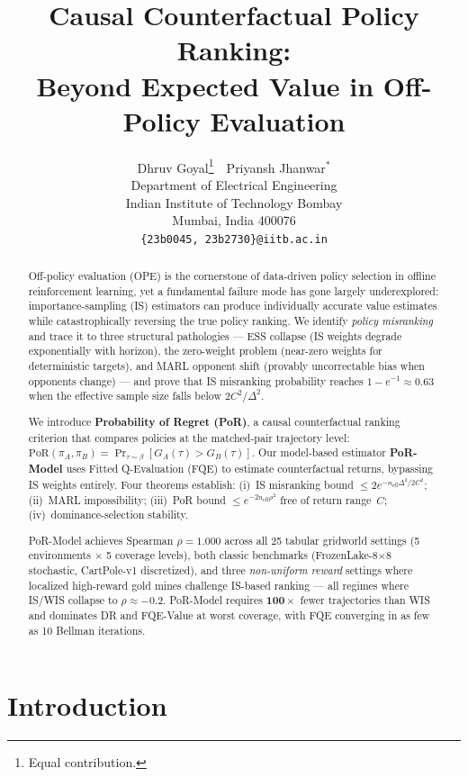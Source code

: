 \documentclass[10pt]{article}
\title{Causal Counterfactual Policy Ranking:\\
       Beyond Expected Value in Off-Policy Evaluation}
\author{%
  Dhruv Goyal\thanks{Equal contribution.}\ \
  Priyansh Jhanwar$^*$\\[2pt]
  Department of Electrical Engineering\\
  Indian Institute of Technology Bombay\\
  Mumbai, India 400076\\
  \texttt{\{23b0045, 23b2730\}@iitb.ac.in}
}
\theoremstyle{plain}
\theoremstyle{definition}
\theoremstyle{remark}
\newcommand{\PoR}{\mathrm{PoR}}
\newcommand{\neff}{n_{\mathrm{eff}}}
\newcommand{\piA}{\pi_A}
\newcommand{\piB}{\pi_B}
\newcommand{\GA}{G_A}
\newcommand{\GB}{G_B}
\begin{document}
\maketitle

\begin{abstract}
Off-policy evaluation (OPE) is the cornerstone of data-driven policy selection
in offline reinforcement learning, yet a fundamental failure mode has gone
largely underexplored: importance-sampling (IS) estimators can produce
individually accurate value estimates while catastrophically reversing the true
policy ranking.  We identify \emph{policy misranking} and trace it to three
structural pathologies --- ESS collapse (IS weights degrade exponentially with
horizon), the zero-weight problem (near-zero weights for deterministic targets),
and MARL opponent shift (provably uncorrectable bias when opponents change) ---
and prove that IS misranking probability reaches $1{-}e^{-1}\!\approx\!0.63$
when the effective sample size falls below $2C^2/\Delta^2$.

We introduce \textbf{Probability of Regret (PoR)}, a causal counterfactual
ranking criterion that compares policies at the matched-pair trajectory level:
$\PoR(\piA,\piB)=\Pr_{\tau\sim\beta}[\GA(\tau)>\GB(\tau)]$.  Our model-based
estimator \textbf{PoR-Model} uses Fitted Q-Evaluation (FQE) to estimate
counterfactual returns, bypassing IS weights entirely.  Four theorems establish:
(i)~IS misranking bound $\leq 2e^{-\neff\Delta^2/2C^2}$; (ii)~MARL
impossibility; (iii)~PoR bound $\leq e^{-2\neff\rho^2}$ free of return
range~$C$; (iv)~dominance-selection stability.

PoR-Model achieves Spearman $\rho{=}1.000$ across all 25 tabular gridworld
settings (5 environments $\times$ 5 coverage levels), both classic benchmarks
(FrozenLake-8$\times$8 stochastic, CartPole-v1 discretized), and three
\emph{non-uniform reward} settings where localized high-reward gold mines
challenge IS-based ranking --- all regimes where IS/WIS collapse to
$\rho{\approx}{-}0.2$.  PoR-Model requires $\mathbf{100{\times}}$ fewer
trajectories than WIS and dominates DR and FQE-Value at worst coverage, with
FQE converging in as few as 10 Bellman iterations.
\end{abstract}

\section{Introduction}
\label{sec:intro}
\end{document}
